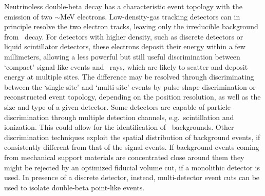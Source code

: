 Neutrinoless double-beta decay has a characteristic event topology with the
emission of two $\sim$MeV electrons. Low-density-gas tracking detectors can in
principle resolve the two electron tracks, leaving only the irreducible
background from \nnbb\ decay. For detectors with higher density, such as
discrete detectors or liquid scintillator detectors, these electrons deposit
their energy within a few millimeters, allowing a less powerful but still
useful discrimination between `compact' signal-like events and \g\ rays, which
are likely to scatter and deposit energy at multiple sites. The difference may
be resolved through discriminating between the `single-site' and `multi-site'
events by pulse-shape discrimination or reconstructed event topology, depending
on the position resolution, as well as the size and type of a given detector.
Some detectors are capable of particle discrimination through multiple
detection channels, e.g.~scintillation and ionization. This could allow for the
identification of \a\ backgrounds. Other discrimination techniques exploit the
spatial distribution of background events, if consistently different from that
of the signal events. If background events coming from mechanical support
materials are concentrated close around them they might be rejected by an
optimized fiducial volume cut, if a monolithic detector is used. In presence of
a discrete detector, instead, multi-detector event cuts can be used to isolate
double-beta point-like events.

